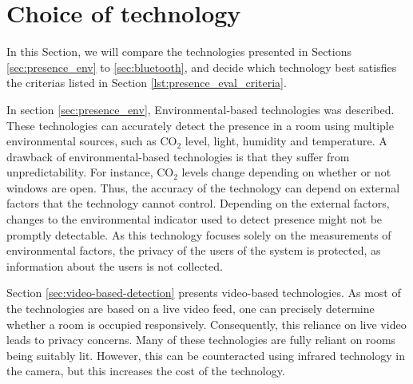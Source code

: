 \section{Choice of technology}
In this Section, we will compare the technologies presented in Sections \ref{sec:presence_env} to \ref{sec:bluetooth}, and decide which technology best satisfies the criterias listed in Section \ref{lst:presence_eval_criteria}. 

In section \ref{sec:presence_env}, Environmental-based technologies was described. These technologies can accurately detect the presence in a room using multiple environmental sources, such as $\text{CO}_{2}$ level, light, humidity and temperature.
A drawback of environmental-based technologies is that they suffer from unpredictability.
For instance, $\text{CO}_{2}$ levels change depending on whether or not windows are open.
Thus, the accuracy of the technology can depend on external factors that the technology cannot control.
Depending on the external factors, changes to the environmental indicator used to detect presence might not be promptly detectable.
As this technology focuses solely on the measurements of environmental factors, the privacy of the users of the system is protected, as information about the users is not collected.

Section \ref{sec:video-based-detection} presents video-based technologies.
As most of the technologies are based on a live video feed, one can precisely determine whether a room is occupied responsively. 
Consequently, this reliance on live video leads to privacy concerns.
Many of these technologies are fully reliant on rooms being suitably lit.
However, this can be counteracted using infrared technology in the camera, but this increases the cost of the technology.   

